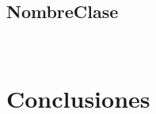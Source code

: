 \subsection{NombreClase}

\begin{lstlisting}[language=Java, caption=NombreClase]
 
\end{lstlisting}


\section{Conclusiones}

